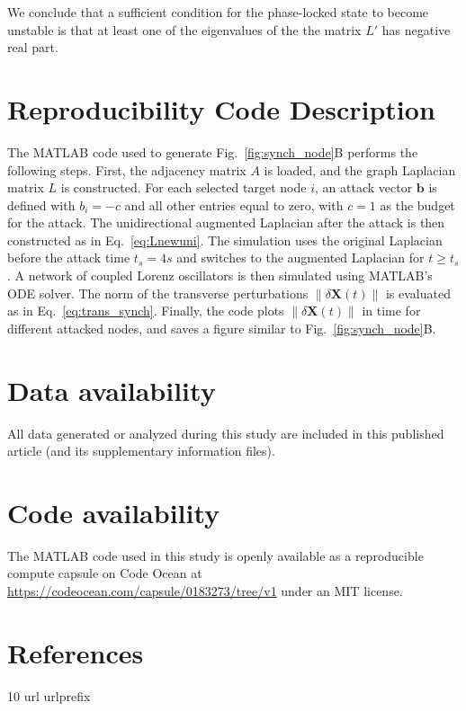 \documentclass[%
 reprint,
 amsmath,amssymb,
 aip,
]{revtex4-2}
\def \bX {\pmb{X}}
\def \bb {\pmb{b}}
\theoremstyle{italichead}
\theoremstyle{definition}
\begin{document}
{We conclude that a sufficient condition for the phase-locked state to become unstable is that at least one of the eigenvalues of the  the matrix $L'$ has negative real part.




\section{Reproducibility Code Description}

The MATLAB code used to generate Fig.~\ref{fig:synch_node}B performs the following steps. 
First, the adjacency matrix $A$ is loaded, and the graph Laplacian matrix $L$ is constructed.
For each selected target node $i$, an attack vector $\bb$ is defined with $b_i=-c$ and all other entries equal to zero, with $c=1$ as the budget for the attack. 
The unidirectional augmented Laplacian after the attack is then constructed as in Eq.~\eqref{eq:Lnewuni}.
The simulation uses the original Laplacian before the attack time $t_s=4 s$ and switches to the augmented Laplacian for $t \geq t_s$. 
A network of coupled Lorenz oscillators is then simulated using MATLAB’s ODE solver. 
The norm of the transverse perturbations $\| \delta \bX (t) \|$ is evaluated as in Eq.~\eqref{eq:trans_synch}. 
Finally, the code plots $\| \delta \bX (t) \|$ in time for different attacked nodes, and saves a figure similar to Fig.~\ref{fig:synch_node}B.

\color{black}

\section*{Data availability}
All data generated or analyzed during this study are included in this published article (and its supplementary information files).





\section*{Code availability}


The MATLAB code used in this study is openly available as a reproducible compute capsule on Code Ocean at \url{https://codeocean.com/capsule/0183273/tree/v1} under an MIT license.


\color{black}

\section*{References}
\begin{thebibliography}{10}
\expandafter\ifx\csname url\endcsname\relax
  \def\url#1{\texttt{#1}}\fi
\expandafter\ifx\csname urlprefix\endcsname\relax\def\urlprefix{URL }\fi
\providecommand{\bibinfo}[2]{#2}
\providecommand{\eprint}[2][]{\url{#2}}


\end{thebibliography}}
\end{document}
